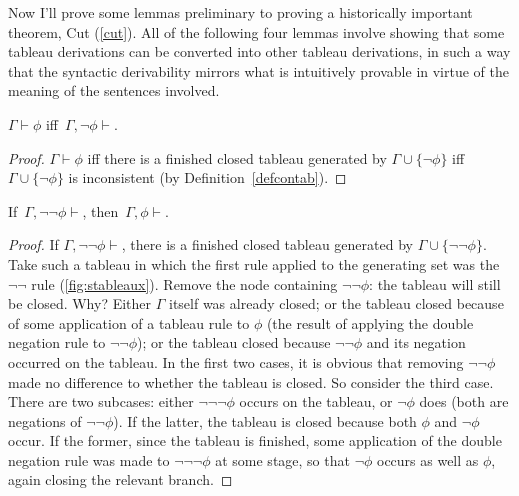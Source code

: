 Now I'll prove some lemmas preliminary to proving a historically important theorem, Cut (\autoref{cut}). All of the following four lemmas involve showing that some tableau derivations can be converted into other tableau derivations, in such a way that the syntactic derivability mirrors what is intuitively provable in virtue of the meaning of the  sentences involved. 

\begin{lemma} \label{switch}
	$\Gamma \vdash \phi$ iff\, $\Gamma, \neg\phi \vdash$.
\end{lemma}
\begin{proof}
	$\Gamma \vdash \phi$ iff there is a finished closed tableau generated by $\Gamma \cup\{\neg\phi\}$ iff $\Gamma\cup\{\neg\phi\}$ is inconsistent (by Definition~\ref{defcontab}).
\end{proof}
\begin{lemma} \label{dne}
	If\, $\Gamma, \neg\neg\phi \vdash$, then\, $\Gamma,\phi \vdash$.
\end{lemma}
\begin{proof}
	If $\Gamma, \neg\neg\phi \vdash$, there is a finished closed tableau generated by $\Gamma \cup \{\neg\neg\phi\}$. Take such a tableau in which the first rule applied to the generating set was the $\neg\neg$ rule (\autoref{fig:stableaux}). Remove the node containing $\neg\neg\phi$: the tableau will still be closed. Why? Either $\Gamma$ itself was already closed; or the tableau closed because of some application of a tableau rule to $\phi$ (the result of applying the double negation rule to $\neg\neg\phi$); or the tableau closed because $\neg\neg\phi$ and its negation occurred on the tableau. In the first two cases, it is obvious that removing $\neg\neg\phi$ made no difference to whether the tableau is closed. So consider the third case. There are two subcases: either $\neg\neg\neg\phi$ occurs on the tableau, or $\neg\phi$ does (both are negations of $\neg\neg\phi$). If the latter, the tableau is closed because both $\phi$ and $\neg\phi$ occur. If the former, since the tableau is finished, some application of the double negation rule was made to $\neg\neg\neg\phi$ at some stage, so that $\neg\phi$ occurs as well as $\phi$, again closing the relevant branch.
\end{proof}


